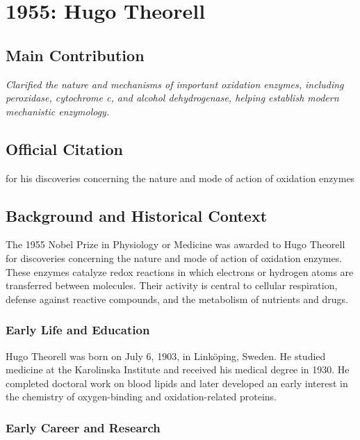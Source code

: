 \chapter[1955 --- Theorell]{1955: Hugo Theorell}
\label{ch:1955_theorell}

\section*{Main Contribution}

\textit{Clarified the nature and mechanisms of important oxidation enzymes, including peroxidase, cytochrome c, and alcohol dehydrogenase, helping establish modern mechanistic enzymology.}\cite{nobel-1955,lecture-1955}

\section{Official Citation}

for his discoveries concerning the nature and mode of action of oxidation enzymes

\section{Background and Historical Context}

The 1955 Nobel Prize in Physiology or Medicine was awarded to Hugo Theorell for discoveries concerning the nature and mode of action of oxidation enzymes. These enzymes catalyze redox reactions in which electrons or hydrogen atoms are transferred between molecules. Their activity is central to cellular respiration, defense against reactive compounds, and the metabolism of nutrients and drugs.

\subsection{Early Life and Education}

Hugo Theorell was born on July 6, 1903, in Link\"oping, Sweden. He studied medicine at the Karolinska Institute and received his medical degree in 1930. He completed doctoral work on blood lipids and later developed an early interest in the chemistry of oxygen-binding and oxidation-related proteins.

\subsection{Early Career and Research}

